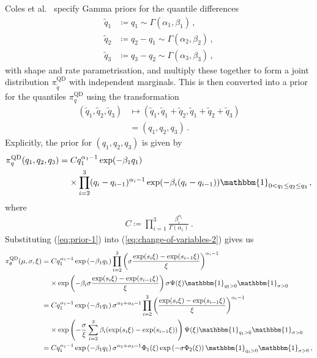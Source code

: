 \documentclass{article}
\begin{document}
%
\label{section:prior-qd}
%
Coles et al.~\cite{coles1996} specify Gamma priors for the quantile differences
%
\begin{align*}
	\tilde{q}_1 &\coloneqq q_1 \sim \Gamma(\alpha_1, \beta_1) \,,\\
	\tilde{q}_2 &\coloneqq q_2 - q_1 \sim \Gamma(\alpha_2, \beta_2) \,,\\
	\tilde{q}_3 &\coloneqq q_3 - q_2 \sim \Gamma(\alpha_3, \beta_3) \,,
\end{align*}
%
with shape and rate parametrisation,
and multiply these together to form a joint distribution
$\pi_{\tilde{q}}^{\text{QD}}$ with independent marginals.
This is then converted into a prior for the quantiles
$\pi_q^{\text{QD}}$ using the transformation
%
\begin{align*}
	(\tilde{q}_1, \tilde{q}_2, \tilde{q}_3)
		&\mapsto (\tilde{q}_1, \tilde{q}_1 + \tilde{q}_2, \tilde{q}_1
		+ \tilde{q}_2 + \tilde{q}_3)\\
	&=(q_1,q_2,q_3)\,.
\end{align*}
%
Explicitly, the prior for $(q_1, q_2, q_3)$ is given by
%
\begin{align}
	\pi^{\text{QD}}_q(q_{1}, q_{2}, q_{3})
		&= C q_{1} ^ {\alpha_1 - 1} \exp(-\beta_1 q_{1}) \nonumber\\
	&\ \phantom{=} \times \prod^{3}_{i=2} (q_{i}-q_{i - 1}) ^ {\alpha_i - 1}
		\exp(-\beta_i(q_i - q_{i - 1}))
		\mathbbm{1}_{0 < q_1 \leq q_2 \leq q_3} \,,
	\label{eq:prior-1}
\end{align}
%
where
%
\begin{align*}
C \coloneqq \prod_{i=1}^3 \frac{\beta ^ {\alpha_i}_i}{\Gamma(\alpha_i)} \,.
\end{align*}
%
Substituting (\ref{eq:prior-1}) into (\ref{eq:change-of-variables-2}) gives us
\begin{align*}
	\pi^{\text{QD}}_\theta(\mu, \sigma, \xi) 
		&=C q_1^{\alpha_1 - 1} \exp\left(-\beta_1 q_1\right)
		\prod^{3}_{i=2} \left(\sigma \frac{\exp(s_{i} \xi)
		- \exp(s_{i - 1}\xi)}{\xi}\right) ^ {\alpha_i - 1} \nonumber\\
	&\ \phantom{=} \times \exp\left(-\beta_i \sigma \frac{\exp(s_{i} \xi)
		- \exp(s_{i - 1}\xi)}{\xi}\right) \sigma \Psi(\xi)
		\mathbbm{1}_{{q_1} > 0} \mathbbm{1}_{\sigma > 0} \nonumber\\
	&=C q_1 ^ {\alpha_1 - 1} \exp\left(-\beta_1 q_1\right)
		\sigma ^ {\alpha_2 + \alpha_3 - 1} \prod^{3}_{i=2}
		\left(\frac{\exp(s_{i} \xi) - \exp(s_{i - 1}\xi)}{\xi}\right)
		^ {\alpha_i-1} \nonumber\\
	&\ \phantom{=} \times \exp\left(-\frac{\sigma}{\xi}
		\sum_{i=2}^3 \beta_i (\exp(s_{i} \xi) - \exp(s_{i-1} \xi))\right)
		\Psi(\xi) \mathbbm{1}_{{q_1} > 0}\mathbbm{1}_{\sigma > 0} \nonumber\\
	&=C q_1 ^ {\alpha_1 - 1} \exp\left(-\beta_1 q_1\right)
		\sigma ^ {\alpha_2 + \alpha_3 - 1} \Phi_1(\xi)
		\exp\left(-\sigma \Phi_2(\xi)\right) \mathbbm{1}_{{q_1} > 0}
		\mathbbm{1}_{\sigma > 0} \,,
\end{align*}
\end{document}
